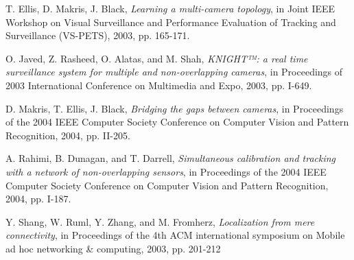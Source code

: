 \documentclass[journal]{IEEEtran}
\begin{document}
%
%
%
\begin{thebibliography}{1}

T. Ellis, D. Makris, J. Black, \emph{Learning a multi-camera topology}, in Joint IEEE Workshop on Visual Surveillance and Performance Evaluation of Tracking and Surveillance (VS-PETS), 2003, pp. 165-171.

O. Javed, Z. Rasheed, O. Alatas, and M. Shah, \emph{KNIGHT™: a real time surveillance system for multiple and non-overlapping cameras}, in Proceedings of 2003 International Conference on Multimedia and Expo, 2003, pp. I-649.

D. Makris, T. Ellis, J. Black, \emph{Bridging the gaps between cameras}, in Proceedings of the 2004 IEEE Computer Society Conference on Computer Vision and Pattern Recognition, 2004, pp. II-205.

A. Rahimi, B. Dunagan, and T. Darrell, \emph{Simultaneous calibration and tracking with a network of non-overlapping sensors}, in Proceedings of the 2004 IEEE Computer Society Conference on Computer Vision and Pattern Recognition, 2004, pp. I-187.

Y. Shang, W. Ruml, Y. Zhang, and M. Fromherz, \emph{Localization from mere connectivity}, in Proceedings of the 4th ACM international symposium on Mobile ad hoc networking \& computing, 2003, pp. 201-212

\end{thebibliography}

\enlargethispage{-5in}



\end{document}

